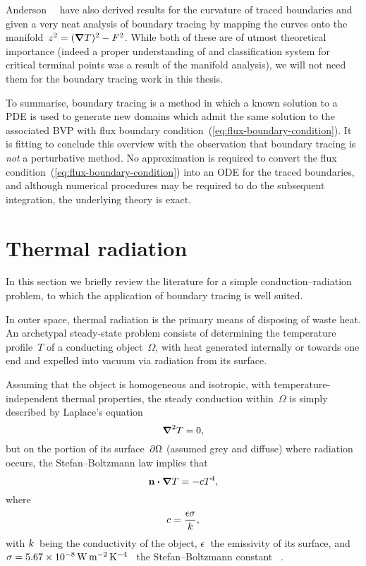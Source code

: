 Anderson~\etal~\cite{anderson-2007-boundary-tracing-i-theory}
have also derived results for the curvature of traced boundaries
and given a very neat analysis of boundary tracing
by mapping the curves onto the manifold~$z^2 = (\mathop{}\!\boldsymbol{\mathbf{\nabla}} T)^2 - F^2$.
While both of these are of utmost theoretical importance
(indeed a proper understanding of and classification system for
critical terminal points was a result of the manifold analysis),
we will not need them for the boundary tracing work in this thesis.

To summarise, boundary tracing is a method in which
a known solution to a PDE is used
to generate new domains which admit the same solution
to the associated BVP
with flux boundary condition~(\ref{eq:flux-boundary-condition}).
It is fitting to conclude this overview with the observation that
boundary tracing is \emph{not} a perturbative method.
No approximation is required
to convert the flux condition~(\ref{eq:flux-boundary-condition})
into an ODE for the traced boundaries,
and although numerical procedures may be required
to do the subsequent integration,
the underlying theory is exact.

\section{Thermal radiation}
\label{sec:introduction.radiation}

In this section
we briefly review the literature for
a simple conduction--radiation problem,
to which the application of boundary tracing is well suited.

In outer space,
thermal radiation is the primary means of disposing of waste heat.
An archetypal steady-state problem consists of
determining the temperature profile~$T$ of a conducting object~$\Omega$,
with heat generated internally or towards one end
and expelled into vacuum via radiation from its surface.

Assuming that the object is homogeneous and isotropic,
with temperature-independent thermal properties,
the steady conduction within~$\Omega$
is simply described by Laplace's equation
\begin{equation}
  \mathop{}\!\boldsymbol{\mathbf{\nabla}}^2 T = 0,
  \label{eq:laplace-steady-conduction}
\end{equation}
but on the portion of its surface~$\mathop{}\!\partial \Omega$
(assumed grey and diffuse) where radiation occurs,
the Stefan--Boltzmann law implies that
\begin{equation}
  \mathop{}\!\boldsymbol{\mathbf{n}} \boldsymbol{\cdot} \mathop{}\!\boldsymbol{\mathbf{\nabla}} T = - c T^4,
  \label{eq:radiation-boundary-condition}
\end{equation}
where
\begin{equation}
  c = \frac{\epsilon \sigma}{k},
  \label{eq:radiation-constant}
\end{equation}
with $k$~being the conductivity of the object,
$\epsilon$~the emissivity of its surface,
and $\stefan = \SI{5.67e-8}{\watt \per\metre\squared \per\kelvin\tothe{4}}$~%
the Stefan--Boltzmann constant~%
\cite{tiesinga-2019-2018-codata-recommended-constants}.

